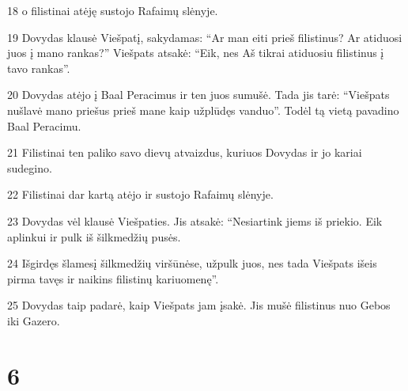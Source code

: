 \par 18 o filistinai atėję sustojo Rafaimų slėnyje. 
\par 19 Dovydas klausė Viešpatį, sakydamas: “Ar man eiti prieš filistinus? Ar atiduosi juos į mano rankas?” Viešpats atsakė: “Eik, nes Aš tikrai atiduosiu filistinus į tavo rankas”. 
\par 20 Dovydas atėjo į Baal Peracimus ir ten juos sumušė. Tada jis tarė: “Viešpats nušlavė mano priešus prieš mane kaip užplūdęs vanduo”. Todėl tą vietą pavadino Baal Peracimu. 
\par 21 Filistinai ten paliko savo dievų atvaizdus, kuriuos Dovydas ir jo kariai sudegino. 
\par 22 Filistinai dar kartą atėjo ir sustojo Rafaimų slėnyje. 
\par 23 Dovydas vėl klausė Viešpaties. Jis atsakė: “Nesiartink jiems iš priekio. Eik aplinkui ir pulk iš šilkmedžių pusės. 
\par 24 Išgirdęs šlamesį šilkmedžių viršūnėse, užpulk juos, nes tada Viešpats išeis pirma tavęs ir naikins filistinų kariuomenę”. 
\par 25 Dovydas taip padarė, kaip Viešpats jam įsakė. Jis mušė filistinus nuo Gebos iki Gazero.



\chapter{6}


